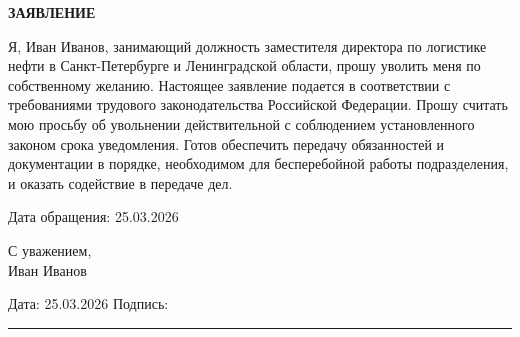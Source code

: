 \documentclass[12pt]{article}
\begin{document}
\begin{center}
\textbf{\LARGE ЗАЯВЛЕНИЕ}
\end{center}

\vspace{1cm}



Я, Иван Иванов, занимающий должность заместителя директора по логистике нефти в Санкт-Петербурге и Ленинградской области, прошу уволить меня по собственному желанию. Настоящее заявление подается в соответствии с требованиями трудового законодательства Российской Федерации. Прошу считать мою просьбу об увольнении действительной с соблюдением установленного законом срока уведомления. Готов обеспечить передачу обязанностей и документации в порядке, необходимом для бесперебойной работы подразделения, и оказать содействие в передаче дел.

\vspace{0.5cm}

Дата обращения: 25.03.2026

\vspace{0.6cm}
С уважением, \\
Иван Иванов

\vfill

\noindent
Дата: 25.03.2026 \hfill Подпись: \rule{5cm}{0.4pt}
\end{document}
